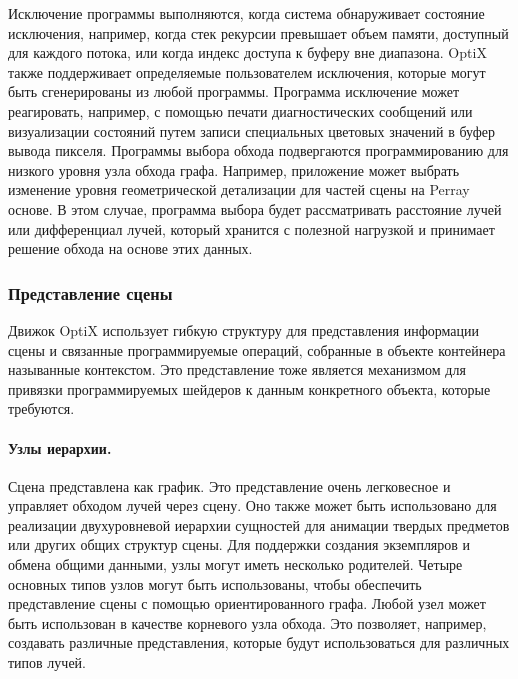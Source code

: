   Исключение программы выполняются, когда система обнаруживает состояние исключения, например, когда стек рекурсии превышает объем памяти, доступный для каждого потока, или когда индекс доступа к буферу вне диапазона.
  OptiX также поддерживает определяемые пользователем исключения, которые могут быть сгенерированы из любой программы.
  Программа исключение может реагировать, например, с помощью печати диагностических сообщений или визуализации состояний путем записи специальных цветовых значений в буфер вывода пикселя.
  Программы выбора обхода подвергаются программированию для низкого уровня узла обхода графа.
  Например, приложение может выбрать изменение уровня геометрической детализации для частей сцены на Perray основе.
  В этом случае, программа выбора будет рассматривать расстояние лучей или дифференциал лучей, который хранится с полезной нагрузкой и принимает решение обхода на основе этих данных.
  
 \subsubsection{Представление сцены}
 
 Движок OptiX использует гибкую структуру для представления информации сцены и связанные программируемые операций, собранные в объекте контейнера называнные контекстом.
 Это представление тоже является механизмом для привязки программируемых шейдеров к данным конкретного объекта, которые требуются.

\paragraph{Узлы иерархии.}

Сцена представлена как график. Это представление очень легковесное и управляет обходом лучей через сцену. 
 Оно также может быть использовано для реализации двухуровневой иерархии сущностей для анимации твердых предметов или других общих структур сцены.
 Для поддержки создания экземпляров и обмена общими данными, узлы могут иметь несколько родителей.
 Четыре основных типов узлов могут быть использованы, чтобы обеспечить представление сцены с помощью ориентированного графа.
 Любой узел может быть использован в качестве корневого узла обхода.
 Это позволяет, например, создавать различные представления, которые будут использоваться для различных типов лучей.
 
